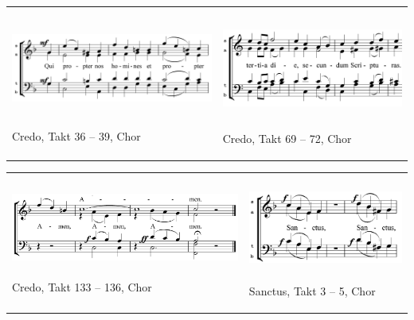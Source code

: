 \begin{flushleft}
\tablefirsthead{}
\tablehead{}
\tabletail{}
\tablelasttail{}
\begin{supertabular}{m{8.281cm}m{7.6990004cm}}

\begin{figure}
\img{}
\caption{}
\end{figure}

\includegraphics[width=8.098cm,height=3.069cm]{pictures/zulassungsarbeit-img111.png}

Credo, Takt 36 – 39, Chor &

\includegraphics[width=7.207cm,height=3.216cm]{pictures/zulassungsarbeit-img112.png}
\begin{figure}
\img{}
\caption{}
\end{figure}
Credo, Takt 69 – 72, Chor\\
\end{supertabular}
\end{flushleft}
\begin{flushleft}
\tablefirsthead{}
\tablehead{}
\tabletail{}
\tablelasttail{}
\begin{supertabular}{m{8.778cm}m{6.208cm}}
\begin{figure}
\img{}
\caption{}
\end{figure}
\includegraphics[width=8.595cm,height=2.515cm]{pictures/zulassungsarbeit-img113.png}

Credo, Takt 133 – 136, Chor &
\begin{figure}
\img{}
\caption{}
\end{figure}
\includegraphics[width=5.681cm,height=2.76cm]{pictures/zulassungsarbeit-img114.png}

Sanctus, Takt 3 – 5, Chor\\
\end{supertabular}
\end{flushleft}
